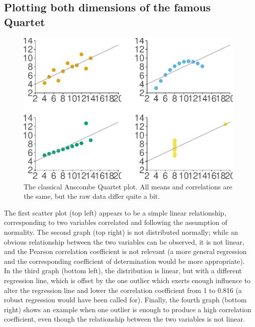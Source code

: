 \documentclass[english,floatsintext,man]{apa6}
\begin{document}
\subsection{Plotting both dimensions of the famous
Quartet}\label{plotting-both-dimensions-of-the-famous-quartet}

\begin{figure}[htbp]
\centering
\includegraphics{APA_Untidy_Paper_files/figure-latex/unnamed-chunk-3-1.pdf}
\caption{\label{fig:unnamed-chunk-3}The classical Anscombe Quartet plot. All
means and correlations are the same, but the raw data differ quite a
bit.}
\end{figure}

The first scatter plot (top left) appears to be a simple linear
relationship, corresponding to two variables correlated and following
the assumption of normality. The second graph (top right) is not
distributed normally; while an obvious relationship between the two
variables can be observed, it is not linear, and the Pearson correlation
coefficient is not relevant (a more general regression and the
corresponding coefficient of determination would be more appropriate).
In the third graph (bottom left), the distribution is linear, but with a
different regression line, which is offset by the one outlier which
exerts enough influence to alter the regression line and lower the
correlation coefficient from 1 to 0.816 (a robust regression would have
been called for). Finally, the fourth graph (bottom right) shows an
example when one outlier is enough to produce a high correlation
coefficient, even though the relationship between the two variables is
not linear.

\newpage 
\end{document}
